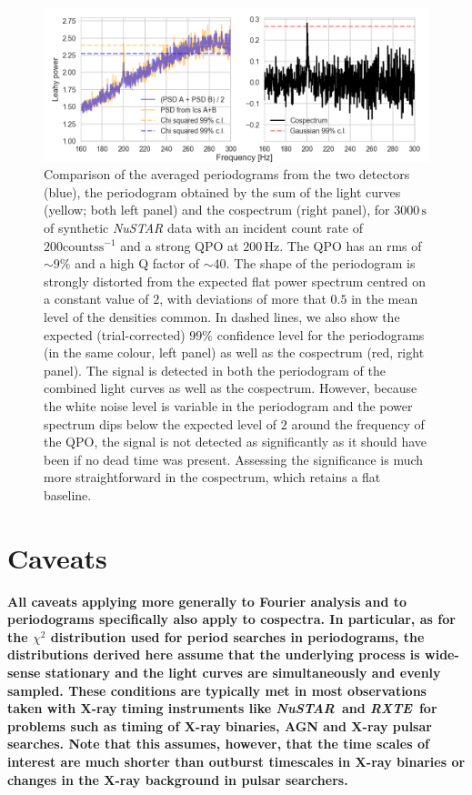 \documentclass[12pt]{emulateapj}
\newcommand{\project}[1]{\textsl{#1}}
\newcommand{\nustar}{\project{NuSTAR}\xspace}
\newcommand{\rxte}{\project{RXTE}\xspace}
\begin{document}
\begin{figure}
\begin{center}
\includegraphics[width=\textwidth]{qpo.png}
\caption{Comparison of the averaged periodograms from the two detectors (blue), the periodogram obtained by the sum of the light curves (yellow; both left panel) and the cospectrum (right panel), for $3000\,\mathrm{s}$ of synthetic \nustar data with an incident count rate of $200 \mathrm{counts}\mathrm{s}^{-1}$ and a strong QPO at $200\,\mathrm{Hz}$. 
The QPO has an rms of $\sim$9\% and a high Q factor of $\sim$40. The shape of the periodogram is strongly distorted from the expected flat power spectrum centred on a constant value of $2$, with deviations of more that $0.5$ in the mean level of the densities common. In dashed lines, we also show the expected (trial-corrected) $99\%$ confidence level for the periodograms (in the same colour, left panel) as well as the cospectrum (red, right panel). The signal is detected in both the periodogram of the combined light curves as well as the cospectrum. However, because the white noise level is variable in the periodogram and the power spectrum dips below the expected level of $2$ around the frequency of the QPO, the signal is not detected as significantly as it should have been if no dead time was present. Assessing the significance is much more straightforward in the cospectrum, which retains a flat baseline.
}
\label{fig:qpo}
\end{center}
\end{figure}


\section{\textbf{Caveats}}

\textbf{All caveats applying more generally to Fourier analysis and to periodograms specifically also apply to cospectra. In particular, as for the $\chi^2$ distribution used for period searches in periodograms, the distributions derived here assume that the underlying process is wide-sense stationary and the light curves are simultaneously and evenly sampled. These conditions are typically met in most observations taken with X-ray timing instruments like \nustar\ and \rxte\ for problems such as timing of X-ray binaries, AGN and X-ray pulsar searches. Note that this assumes, however, that the time scales of interest are much shorter than outburst timescales in X-ray binaries or changes in the X-ray background in pulsar searchers.}
\end{document}
